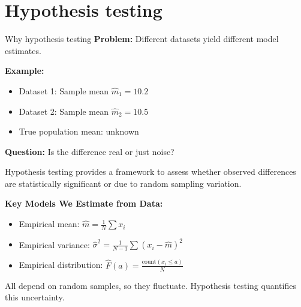 \documentclass{beamer}
\begin{document}
\section{Hypothesis testing}
\begin{frame}{Why hypothesis testing}
\textbf{Problem:} Different datasets yield different model estimates.

\vspace{0.5cm}

\textbf{Example:}
\begin{itemize}
    \item Dataset 1: Sample mean $\hat{m}_1 = 10.2$
    \item Dataset 2: Sample mean $\hat{m}_2 = 10.5$
    \item True population mean: unknown
\end{itemize}

\vspace{0.5cm}

\textbf{Question:} Is the difference real or just noise?

\vspace{0.5cm}

Hypothesis testing provides a framework to assess whether observed differences are statistically significant or due to random sampling variation.

\vspace{0.5cm}

\textbf{Key Models We Estimate from Data:}
\begin{itemize}
    \item Empirical mean: $\hat{m} = \frac{1}{N}\sum x_i$
    \item Empirical variance: $\hat{\sigma}^2 = \frac{1}{N-1}\sum (x_i - \hat{m})^2$
    \item Empirical distribution: $\hat{F}(a) = \frac{\text{count}(x_i \le a)}{N}$
\end{itemize}

\vspace{0.5cm}

All depend on random samples, so they fluctuate. Hypothesis testing quantifies this uncertainty.

\end{frame}
\end{document}
